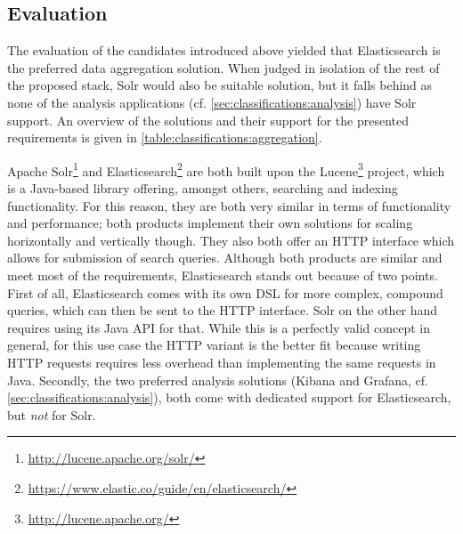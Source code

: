 \subsection{Evaluation}

The evaluation of the candidates introduced above yielded that Elasticsearch is the preferred data aggregation solution.
When judged in isolation of the rest of the proposed stack, Solr would also be suitable solution, but it falls behind as none of the analysis applications (cf. \cref{sec:classifications:analysis}) have Solr support.
An overview of the solutions and their support for the presented requirements is given in \cref{table:classifications:aggregation}.

\begin{table}[t]
\centering
\caption{Classification of data aggregation solutions. Support for arbitrary data structures, search capabilities, and combination of aggregations is not considered here since all solutions fulfill this requirement.}
\label{table:classifications:aggregation}
\end{table}

Apache Solr\footnote{\url{http://lucene.apache.org/solr/}} and Elasticsearch\footnote{\url{https://www.elastic.co/guide/en/elasticsearch/}} are both built upon the Lucene\footnote{\url{http://lucene.apache.org/}} project, which is a Java-based library offering, amongst others, searching and indexing functionality.
For this reason, they are both very similar in terms of functionality and performance; both products implement their own solutions for scaling horizontally and vertically though.
They also both offer an HTTP interface which allows for submission of search queries.
Although both products are similar and meet most of the requirements, Elasticsearch stands out because of two points. 
First of all, Elasticsearch comes with its own \ac{DSL} for more complex, compound queries, which can then be sent to the HTTP interface.
Solr on the other hand requires using its Java API for that.
While this is a perfectly valid concept in general, for this use case the HTTP variant is the better fit because writing HTTP requests requires less overhead than implementing the same requests in Java.
Secondly, the two preferred analysis solutions (Kibana and Grafana, cf. \cref{sec:classifications:analysis}), both come with dedicated support for Elasticsearch, but \emph{not} for Solr.

